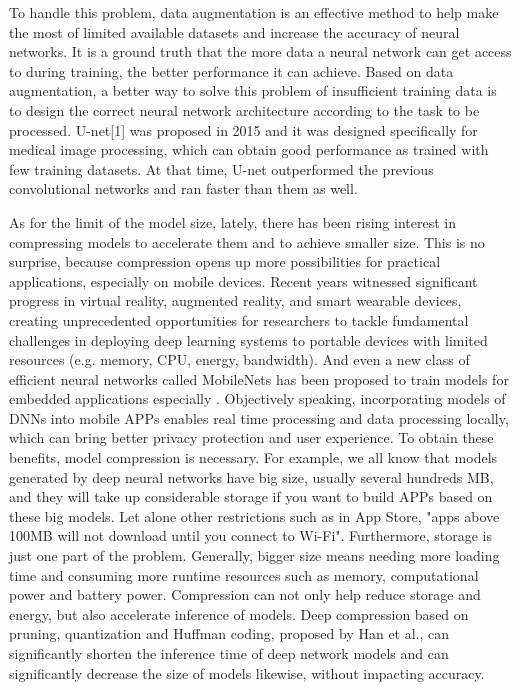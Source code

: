 \documentclass[sigconf]{acmart}
\begin{document}
To handle this problem, data augmentation \cite{data-augmentation} is an effective method to help make the most of limited available datasets and increase the accuracy of neural networks. It is a ground truth that the more data a neural network can get access to during training, the better performance it can achieve. Based on data augmentation, a better way to solve this problem of insufficient training data is to design the correct neural network architecture according to the task to be processed. U-net[1] was proposed in 2015 and it was designed specifically for medical image processing, which can obtain good performance as trained with few training datasets. At that time, U-net outperformed the previous convolutional networks and ran faster than them as well.

As for the limit of the model size, lately, there has been rising interest in compressing models to accelerate them and to achieve smaller size. This is no surprise, because compression opens up more possibilities for practical applications, especially on mobile devices. Recent years witnessed significant progress in virtual reality, augmented reality, and smart wearable devices, creating unprecedented opportunities for researchers to tackle fundamental challenges in deploying deep learning systems to portable devices with limited resources (e.g. memory, CPU, energy, bandwidth)\cite{survey-of-compression}. And even a new class of efficient neural networks called MobileNets has been proposed to train models for embedded applications especially \cite{mobilenets}. Objectively speaking, incorporating models of DNNs into mobile APPs enables real time processing and data processing locally, which can bring better privacy protection and user experience. To obtain these benefits, model compression is necessary. For example, we all know that models generated by deep neural networks have big size, usually several hundreds MB, and they will take up considerable storage if you want to build APPs based on these big models. Let alone other restrictions such as in App Store, "apps above 100MB will not download until you connect to Wi-Fi"\cite{deep-compression}. Furthermore, storage is just one part of the problem. Generally, bigger size means needing more loading time and consuming more runtime resources such as memory, computational power and battery power. Compression can not only help reduce storage and energy, but also accelerate inference of models. Deep compression based on pruning, quantization and Huffman coding, proposed by Han et al., can significantly shorten the inference time of deep network models and can significantly decrease the size of models likewise, without impacting accuracy\cite{deep-compression}.
\end{document}
